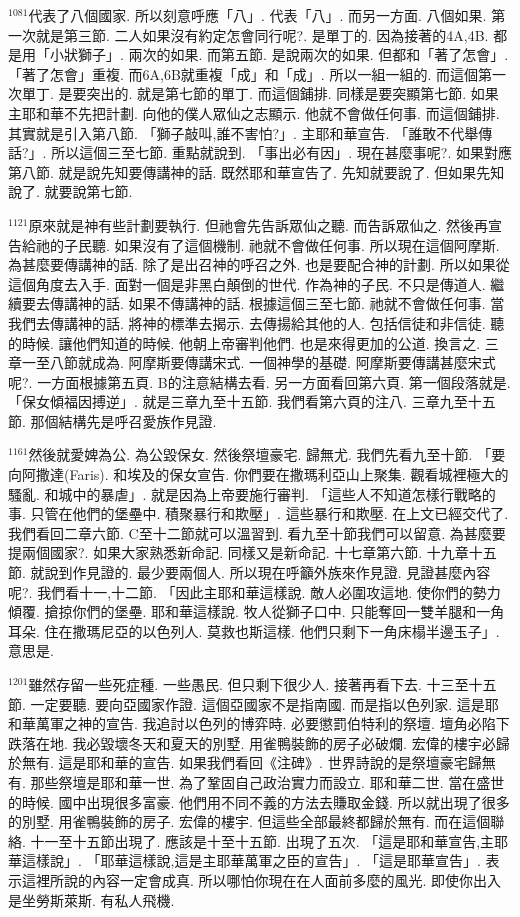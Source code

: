 \documentclass{book}
\begin{document}
$^{1081}$代表了八個國家.
所以刻意呼應「八」.
代表「八」.
而另一方面.
八個如果.
第一次就是第三節.
二人如果沒有約定怎會同行呢?.
是單丁的.
因為接著的4A,4B.
都是用「小狀獅子」.
兩次的如果.
而第五節.
是說兩次的如果.
但都和「著了怎會」.
「著了怎會」重複.
而6A,6B就重複「成」和「成」.
所以一組一組的.
而這個第一次單丁.
是要突出的.
就是第七節的單丁.
而這個鋪排.
同樣是要突顯第七節.
如果主耶和華不先把計劃.
向他的僕人眾仙之志顯示.
他就不會做任何事.
而這個鋪排.
其實就是引入第八節.
「獅子敲叫,誰不害怕?」.
主耶和華宣告.
「誰敢不代舉傳話?」.
所以這個三至七節.
重點就說到.
「事出必有因」.
現在甚麼事呢?.
如果對應第八節.
就是說先知要傳講神的話.
既然耶和華宣告了.
先知就要說了.
但如果先知說了.
就要說第七節.

$^{1121}$原來就是神有些計劃要執行.
但祂會先告訴眾仙之聽.
而告訴眾仙之.
然後再宣告給祂的子民聽.
如果沒有了這個機制.
祂就不會做任何事.
所以現在這個阿摩斯.
為甚麼要傳講神的話.
除了是出召神的呼召之外.
也是要配合神的計劃.
所以如果從這個角度去入手.
面對一個是非黑白顛倒的世代.
作為神的子民.
不只是傳道人.
繼續要去傳講神的話.
如果不傳講神的話.
根據這個三至七節.
祂就不會做任何事.
當我們去傳講神的話.
將神的標準去揭示.
去傳揚給其他的人.
包括信徒和非信徒.
聽的時候.
讓他們知道的時候.
他朝上帝審判他們.
也是來得更加的公道.
換言之.
三章一至八節就成為.
阿摩斯要傳講宋式.
一個神學的基礎.
阿摩斯要傳講甚麼宋式呢?.
一方面根據第五頁.
B的注意結構去看.
另一方面看回第六頁.
第一個段落就是.
「保女傾福因搏逆」.
就是三章九至十五節.
我們看第六頁的注八.
三章九至十五節.
那個結構先是呼召愛族作見證.

$^{1161}$然後就愛婢為公.
為公毀保女.
然後祭壇豪宅.
歸無尤.
我們先看九至十節.
「要向阿撒達(Faris).
和埃及的保女宣告.
你們要在撒瑪利亞山上聚集.
觀看城裡極大的騷亂.
和城中的暴虐」.
就是因為上帝要施行審判.
「這些人不知道怎樣行戰略的事.
只管在他們的堡壘中.
積聚暴行和欺壓」.
這些暴行和欺壓.
在上文已經交代了.
我們看回二章六節.
C至十二節就可以溫習到.
看九至十節我們可以留意.
為甚麼要提兩個國家?.
如果大家熟悉新命記.
同樣又是新命記.
十七章第六節.
十九章十五節.
就說到作見證的.
最少要兩個人.
所以現在呼籲外族來作見證.
見證甚麼內容呢?.
我們看十一,十二節.
「因此主耶和華這樣說.
敵人必圍攻這地.
使你們的勢力傾覆.
搶掠你們的堡壘.
耶和華這樣說.
牧人從獅子口中.
只能奪回一雙羊腿和一角耳朵.
住在撒瑪尼亞的以色列人.
莫救也斯這樣.
他們只剩下一角床榻半邊玉子」.
意思是.

$^{1201}$雖然存留一些死症種.
一些愚民.
但只剩下很少人.
接著再看下去.
十三至十五節.
一定要聽.
要向亞國家作證.
這個亞國家不是指南國.
而是指以色列家.
這是耶和華萬軍之神的宣告.
我追討以色列的博弈時.
必要懲罰伯特利的祭壇.
壇角必陷下跌落在地.
我必毀壞冬天和夏天的別墅.
用雀鴨裝飾的房子必破爛.
宏偉的樓宇必歸於無有.
這是耶和華的宣告.
如果我們看回《注碑》.
世界詩說的是祭壇豪宅歸無有.
那些祭壇是耶和華一世.
為了鞏固自己政治實力而設立.
耶和華二世.
當在盛世的時候.
國中出現很多富豪.
他們用不同不義的方法去賺取金錢.
所以就出現了很多的別墅.
用雀鴨裝飾的房子.
宏偉的樓宇.
但這些全部最終都歸於無有.
而在這個聯絡.
十一至十五節出現了.
應該是十至十五節.
出現了五次.
「這是耶和華宣告,主耶華這樣說」.
「耶華這樣說,這是主耶華萬軍之臣的宣告」.
「這是耶華宣告」.
表示這裡所說的內容一定會成真.
所以哪怕你現在在人面前多麼的風光.
即使你出入是坐勞斯萊斯.
有私人飛機.
\end{document}
